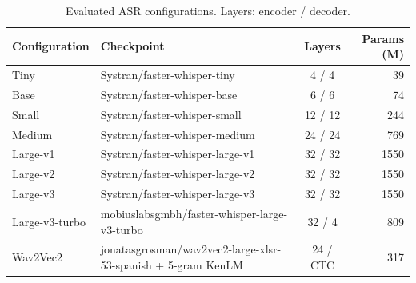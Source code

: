 \begin{table}[!t]
\centering
\caption{Evaluated ASR configurations. Layers: encoder / decoder.}
\label{tab:models}
\scriptsize
\setlength{\tabcolsep}{3pt}
\begin{tabular}{l>{\raggedright\arraybackslash}p{3.4cm}cr}
\hline
Configuration & Checkpoint & Layers & Params (M) \\
\hline
Tiny & Systran/\allowbreak faster-whisper-tiny & 4 / 4 & 39 \\
Base & Systran/\allowbreak faster-whisper-base & 6 / 6 & 74 \\
Small & Systran/\allowbreak faster-whisper-small & 12 / 12 & 244 \\
Medium & Systran/\allowbreak faster-whisper-medium & 24 / 24 & 769 \\
Large-v1 & Systran/\allowbreak faster-whisper-large-v1 & 32 / 32 & 1550 \\
Large-v2 & Systran/\allowbreak faster-whisper-large-v2 & 32 / 32 & 1550 \\
Large-v3 & Systran/\allowbreak faster-whisper-large-v3 & 32 / 32 & 1550 \\
Large-v3-turbo & mobiuslabsgmbh/\allowbreak faster-whisper-large-v3-turbo & 32 / 4 & 809 \\
Wav2Vec2 & jonatasgrosman/\allowbreak wav2vec2-large-xlsr-53-spanish + 5-gram KenLM & 24 / CTC & 317 \\
\hline
\end{tabular}
\end{table}
